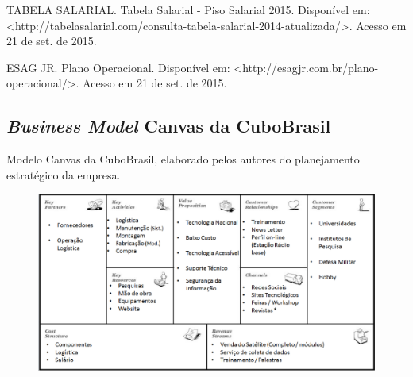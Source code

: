 \documentclass[
	12pt,				%
	openright,			%
	oneside,			%
	a4paper,			%
	english,			%
	french,				%
	spanish,			%
	brazil				%
	]{abntex2}
\begin{document}
	TABELA SALARIAL. Tabela Salarial - Piso Salarial 2015. Disponível em:\\ <http://tabelasalarial.com/consulta-tabela-salarial-2014-atualizada/>. Acesso em 21 de set. de 2015.
	
	ESAG JR. Plano Operacional. Disponível em: <http://esagjr.com.br/plano-operacional/>. Acesso em 21 de set. de 2015.


\begin{anexosenv}

\partanexos

\chapter{\textit{Business Model} Canvas da CuboBrasil}
	Modelo Canvas da CuboBrasil, elaborado pelos autores do planejamento estratégico da empresa.
	
	\begin{figure}[th]
		\centering
		\includegraphics[width=1.0\linewidth]{./figs/Anexo_01}
	\end{figure}

\end{anexosenv}



% 









\printindex
\end{document}
